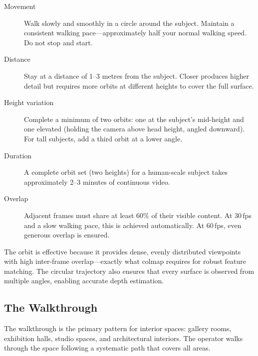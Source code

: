 \begin{description}
  \item[Movement] Walk slowly and smoothly in a circle around the subject. Maintain a consistent walking pace---approximately half your normal walking speed. Do not stop and start.
  \item[Distance] Stay at a distance of 1--3 metres from the subject. Closer produces higher detail but requires more orbits at different heights to cover the full surface.
  \item[Height variation] Complete a minimum of two orbits: one at the subject's mid-height and one elevated (holding the camera above head height, angled downward). For tall subjects, add a third orbit at a lower angle.
  \item[Duration] A complete orbit set (two heights) for a human-scale subject takes approximately 2--3 minutes of continuous video.
  \item[Overlap] Adjacent frames must share at least 60\% of their visible content. At 30\,fps and a slow walking pace, this is achieved automatically. At 60\,fps, even generous overlap is ensured.
\end{description}

\begin{technote}
The orbit is effective because it provides dense, evenly distributed viewpoints with high inter-frame overlap---exactly what \acrshort{colmap} requires for robust feature matching. The circular trajectory also ensures that every surface is observed from multiple angles, enabling accurate depth estimation.
\end{technote}

\subsection{The Walkthrough}
\label{sec:cap-walkthrough}

The walkthrough is the primary pattern for interior spaces: gallery rooms, exhibition halls, studio spaces, and architectural interiors. The operator walks through the space following a systematic path that covers all areas.


